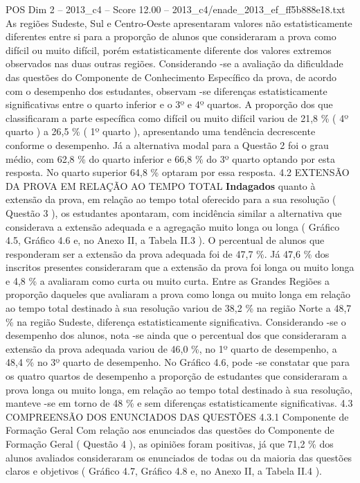 \begin{textsample}{POS Dim 2 – 2013\_c4 – Score 12.00 – 2013\_c4/enade\_2013\_ef\_ff5b888e18.txt}
As regiões Sudeste, Sul e Centro-Oeste apresentaram valores não estatisticamente diferentes entre si para a proporção de alunos que consideraram a prova como difícil ou muito difícil, porém estatisticamente diferente dos valores extremos observados nas duas outras regiões.
Considerando -se a avaliação da dificuldade das questões do Componente de Conhecimento Específico da prova, de acordo com o desempenho dos estudantes, observam -se diferenças estatisticamente significativas entre o quarto inferior e o 3º e 4º quartos.
A proporção dos que classificaram a parte específica como difícil ou muito difícil variou de 21,8 \% ( 4º quarto ) a 26,5 \% ( 1º quarto ), apresentando uma tendência decrescente conforme o desempenho.
Já a alternativa modal para a Questão 2 foi o grau médio, com 62,8 \% do quarto inferior e 66,8 \% do 3º quarto optando por esta resposta.
No quarto superior 64,8 \% optaram por essa resposta. 4.2 EXTENSÃO DA PROVA EM RELAÇÃO AO TEMPO TOTAL \textbf{Indagados} quanto à extensão da prova, em relação ao tempo total oferecido para a sua resolução ( Questão 3 ), os estudantes apontaram, com incidência similar a alternativa que considerava a extensão adequada e a agregação muito longa ou longa ( Gráfico 4.5, Gráfico 4.6 e, no Anexo II, a Tabela II.3 ).
O percentual de alunos que responderam ser a extensão da prova adequada foi de 47,7 \%.
Já 47,6 \% dos inscritos presentes consideraram que a extensão da prova foi longa ou muito longa e 4,8 \% a avaliaram como curta ou muito curta.
Entre as Grandes Regiões a proporção daqueles que avaliaram a prova como longa ou muito longa em relação ao tempo total destinado à sua resolução variou de 38,2 \% na região Norte a 48,7 \% na região Sudeste, diferença estatisticamente significativa.
Considerando -se o desempenho dos alunos, nota -se ainda que o percentual dos que consideraram a extensão da prova adequada variou de 46,0 \%, no 1º quarto de desempenho, a 48,4 \% no 3º quarto de desempenho.
No Gráfico 4.6, pode -se constatar que para os quatro quartos de desempenho a proporção de estudantes que consideraram a prova longa ou muito longa, em relação ao tempo total destinado à sua resolução, manteve -se em torno de 48 \% e sem diferenças estatisticamente significativas. 4.3 COMPREENSÃO DOS ENUNCIADOS DAS QUESTÕES 4.3.1 Componente de Formação Geral Com relação aos enunciados das questões do Componente de Formação Geral ( Questão 4 ), as opiniões foram positivas, já que 71,2 \% dos alunos avaliados consideraram os enunciados de todas ou da maioria das questões claros e objetivos ( Gráfico 4.7, Gráfico 4.8 e, no Anexo II, a Tabela II.4 ).

\end{textsample}
